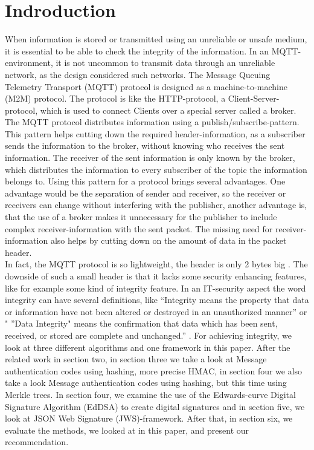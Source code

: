 \section{Indroduction}

When information is stored or transmitted using an unreliable or unsafe medium, it is essential to be able to check the integrity of the information. In an MQTT-environment, it is not uncommon to transmit data through an unreliable network, as the design considered such networks. The Message Queuing Telemetry Transport (MQTT) protocol is designed as a machine-to-machine (M2M) protocol. The protocol is like the HTTP-protocol, a Client-Server-protocol, which is used to connect Clients over a special server called a broker. The MQTT protocol distributes information using a publish/subscribe-pattern. This pattern helps cutting down the required header-information, as a subscriber sends the information to the broker, without knowing who receives the sent information. The receiver of the sent information is only known by the broker, which distributes the information to every subscriber of the topic the information belongs to. Using this pattern for a protocol brings several advantages. One advantage would be the separation of sender and receiver, so the receiver or receivers can change without interfering with the publisher, another advantage is, that the use of a broker makes it unnecessary for the publisher to include complex receiver-information with the sent packet. The missing need for receiver-information also helps by cutting down on the amount of data in the packet header. \\
In fact, the MQTT protocol is so lightweight, the header is only 2 bytes big \cite{IBM}. The downside of such a small header is that it lacks some security enhancing features, like for example some kind of integrity feature. In an IT-security aspect the word integrity can have several definitions, like “Integrity means the property that data or information have not been altered or destroyed in an unauthorized manner”\cite{INTI1} or " ”Data Integrity" means the confirmation that data which has been sent, received, or stored are complete and unchanged.” \cite{INTI2}. For achieving integrity, we look at three different algorithms and one framework in this paper. After the related work in section two, in section three we take a look at Message authentication codes using hashing, more precise HMAC, in section four we also take a look Message authentication codes using hashing, but this time using Merkle trees. In section four, we examine the use of the Edwards-curve Digital Signature Algorithm (EdDSA) to create digital signatures and in section five, we look at JSON Web Signature (JWS)-framework. After that, in section six, we evaluate the methods, we looked at in this paper, and present our recommendation.
